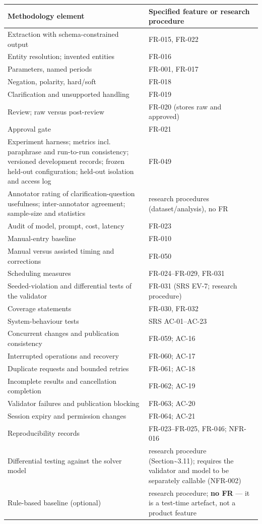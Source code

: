 \documentclass[
  11pt,a4paper,oneside]{report}
\begin{document}
\begin{longtable}[]{@{}p{\dimexpr(\linewidth-4\tabcolsep)/2\relax}p{\dimexpr(\linewidth-4\tabcolsep)/2\relax}@{}}
\toprule\noalign{}
Methodology element & Specified feature or research procedure \\
\midrule\noalign{}
\endhead
\bottomrule\noalign{}
\endlastfoot
Extraction with schema-constrained output & FR-015, FR-022 \\
Entity resolution; invented entities & FR-016 \\
Parameters, named periods & FR-001, FR-017 \\
Negation, polarity, hard/soft & FR-018 \\
Clarification and unsupported handling & FR-019 \\
Review; raw versus post-review & FR-020 (stores raw and approved) \\
Approval gate & FR-021 \\
Experiment harness; metrics incl. paraphrase and run-to-run consistency;
versioned development records; frozen held-out configuration; held-out
isolation and access log & FR-049 \\
Annotator rating of clarification-question usefulness; inter-annotator
agreement; sample-size and statistics & research procedures
(dataset/analysis), no FR \\
Audit of model, prompt, cost, latency & FR-023 \\
Manual-entry baseline & FR-010 \\
Manual versus assisted timing and corrections & FR-050 \\
Scheduling measures & FR-024--FR-029, FR-031 \\
Seeded-violation and differential tests of the validator & FR-031 (SRS
EV-7; research procedure) \\
Coverage statements & FR-030, FR-032 \\
System-behaviour tests & SRS AC-01--AC-23 \\
Concurrent changes and publication consistency & FR-059; AC-16 \\
Interrupted operations and recovery & FR-060; AC-17 \\
Duplicate requests and bounded retries & FR-061; AC-18 \\
Incomplete results and cancellation completion & FR-062; AC-19 \\
Validator failures and publication blocking & FR-063; AC-20 \\
Session expiry and permission changes & FR-064; AC-21 \\
Reproducibility records & FR-023--FR-025, FR-046; NFR-016 \\
Differential testing against the solver model & research procedure
(Section\textasciitilde3.11); requires the validator and model to be
separately callable (NFR-002) \\
Rule-based baseline (optional) & research procedure; \textbf{no FR} ---
it is a test-time artefact, not a product feature \\
\end{longtable}
\end{document}
